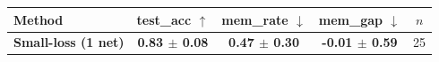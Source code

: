 \begin{tabular}{lcccc}
\toprule
Method & test\_acc $\uparrow$ & mem\_rate $\downarrow$ & mem\_gap $\downarrow$ & $n$ \\
\midrule
\textbf{Small-loss (1 net)} & \textbf{0.83 $\pm$ 0.08} & \textbf{0.47 $\pm$ 0.30} & \textbf{-0.01 $\pm$ 0.59} & 25 \\
\bottomrule
\end{tabular}
